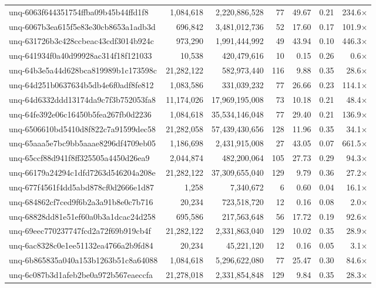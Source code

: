 \begin{table}[h!]
\begin{tabular}{lrrrrrr}
unq-6063f644351754ffba09b45b44ffd1f8 & 1,084,618 & 2,220,886,528 & 77 & 49.67 & 0.21 & 234.6$\times$ \\
unq-6067b3ea615f5e83e30cb8653a1adb3d & 696,842 & 3,481,012,736 & 52 & 17.60 & 0.17 & 101.9$\times$ \\
unq-631726b3c428ccbeac43cdf3014b924c & 973,290 & 1,991,444,992 & 49 & 43.94 & 0.10 & 446.3$\times$ \\
unq-641934f0a40d99928ac314f18f121033 & 10,538 & 420,479,616 & 10 & 0.15 & 0.26 & 0.6$\times$ \\
unq-64b3e5a44d628bca819989b1c173598c & 21,282,122 & 582,973,440 & 116 & 9.88 & 0.35 & 28.6$\times$ \\
unq-64d251b0637634b5db4e6f0adf8fe812 & 1,083,586 & 331,039,232 & 77 & 26.66 & 0.23 & 114.1$\times$ \\
unq-64d6332ddd13174da9c7f3b752053fa8 & 11,174,026 & 17,969,195,008 & 73 & 10.18 & 0.21 & 48.4$\times$ \\
unq-64fe392e06c16450b5fea267fb0d2236 & 1,084,618 & 35,534,146,048 & 77 & 29.40 & 0.21 & 136.9$\times$ \\
unq-6506610bd5410d8f822c7a91599dec58 & 21,282,058 & 57,439,430,656 & 128 & 11.96 & 0.35 & 34.1$\times$ \\
unq-65aaa5e7bc9bb5aaae8296df4709eb05 & 1,186,698 & 2,431,915,008 & 27 & 43.05 & 0.07 & 661.5$\times$ \\
unq-65ccf88d941f8ff325505a4450d26ea9 & 2,044,874 & 482,200,064 & 105 & 27.73 & 0.29 & 94.3$\times$ \\
unq-66179a24294c1dfd7263d546204a208e & 21,282,122 & 37,309,655,040 & 129 & 9.79 & 0.36 & 27.2$\times$ \\
unq-677f4561f4dd5abd878cf0d2666e1d87 & 1,258 & 7,340,672 & 6 & 0.60 & 0.04 & 16.1$\times$ \\
unq-684862cf7ced9f6b2a3a91b8e0c7b716 & 20,234 & 723,518,720 & 12 & 0.16 & 0.08 & 2.0$\times$ \\
unq-68828dd81e51ef60a0b3a1dcac24d258 & 695,586 & 217,563,648 & 56 & 17.72 & 0.19 & 92.6$\times$ \\
unq-69eec770237747fcd2a72f69b919cb4f & 21,282,122 & 2,331,863,040 & 129 & 10.02 & 0.35 & 28.9$\times$ \\
unq-6ac8328c0e1ee51132ea4766a2b9fd84 & 20,234 & 45,221,120 & 12 & 0.16 & 0.05 & 3.1$\times$ \\
unq-6b865835a040a153b1263b51c8a64088 & 1,084,618 & 5,296,622,080 & 77 & 25.47 & 0.30 & 84.6$\times$ \\
unq-6c087b3d1afeb2be0a972b567eaeccfa & 21,278,018 & 2,331,854,848 & 129 & 9.84 & 0.35 & 28.3$\times$ \\

\end{tabular}
\end{table}
